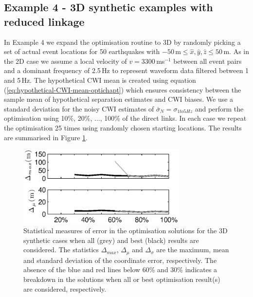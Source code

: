 \documentclass[extra]{gji}
\begin{document}
\subsection{Example 4 - 3D synthetic examples with reduced linkage}

In Example 4 we expand the optimisation routine to 3D by randomly picking
 a set of actual event locations for 50 earthquakes with
$-50$\,m$\leq \hat{x},\hat{y},\hat{z} \leq 50$\,m. As in the 2D case we assume a local velocity
of $v=3300\,$ms$^{-1}$ between all event pairs and a dominant frequency of 2.5$\,$Hz to represent
 waveform data filtered between 1 and 5$\,$Hz.
The hypothetical CWI mean is created using equation (\ref{eq:hypothetical-CWI-mean-optichapt})
which ensures consistency between the sample mean of hypothetical separation estimates and CWI
biases. We use a standard deviation for the noisy CWI estimates
of $\bar{\sigma}_N = \sigma_{1to5Hz}$ and perform the optimisation using 10\%,
20\%, ..., 100\% of the direct links.
In each case we repeat the
optimisation 25 times using randomly chosen starting locations. The results are
summarised in Figure \ref{fig:optimisationresults-3Dsynth}.

\begin{figure}
\noindent\includegraphics[width = 20pc]{diags/synth3Dmulti/ressummary_3Dsynth50eq.eps}
\caption{Statistical measures of error in the optimisation solutions for the 3D synthetic cases when all (grey)
and best (black) results are considered. The statistics $\Delta_{max}$, $\Delta_\mu$ and
$\Delta_\sigma$ are the maximum, mean and standard deviation of the coordinate error, respectively.
The absence of the blue and red lines below 60\% and 30\% indicates a breakdown in the solutions
when all or best optimisation result(s) are considered, respectively.}
\label{fig:optimisationresults-3Dsynth}
\end{figure}
\end{document}
